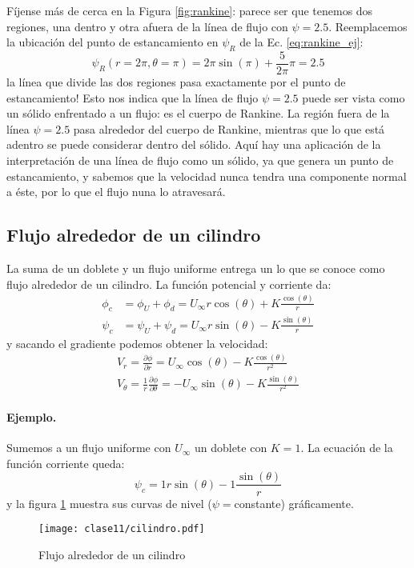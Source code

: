 Fíjense más de cerca en la Figura \ref{fig:rankine}: parece ser que tenemos dos regiones, una dentro y otra afuera de la línea de flujo con $\psi=2.5$. 
Reemplacemos la ubicación del punto de estancamiento en $\psi_R$ de la Ec. \eqref{eq:rankine_ej}:
%
\begin{equation}
\psi_R(r=2\pi,\theta=\pi) = 2\pi\sin(\pi)+\frac{5}{2\pi}\pi = 2.5
\end{equation}
%
la línea que divide las dos regiones pasa exactamente por el punto de estancamiento! 
Esto nos indica que la línea de flujo $\psi=2.5$ puede ser vista como un sólido enfrentado a un flujo: es el cuerpo de Rankine.
La región fuera de la línea $\psi=2.5$ pasa alrededor del cuerpo de Rankine, mientras que lo que está adentro se puede considerar dentro del sólido.
Aquí hay una aplicación de la interpretación de una línea de flujo como un sólido, ya que genera un punto de estancamiento, y sabemos que la velocidad nunca tendra una componente normal a éste, por lo que el flujo nuna lo atravesará.

\subsection*{Flujo alrededor de un cilindro}
La suma de un doblete y un flujo uniforme entrega un lo que se conoce como flujo alrededor de un cilindro.
La función potencial y corriente da:
%
\begin{align}\label{eq:cilindro_pot}
\phi_c &= \phi_U+\phi_d = U_\infty r\cos(\theta) + K\frac{\cos(\theta)}{r}\nonumber\\
\psi_c &= \psi_U+\psi_d = U_\infty r\sin(\theta) - K\frac{\sin(\theta)}{r}
\end{align}
%
y sacando el gradiente podemos obtener la velocidad:
%
\begin{align}\label{eq:cilindro_vel}
V_r = \frac{\partial\phi}{\partial r} = U_\infty\cos(\theta) - K\frac{\cos(\theta)}{r^2} \nonumber\\
V_\theta = \frac{1}{r}\frac{\partial\phi}{\partial\theta} = -U_\infty\sin(\theta) - K\frac{\sin(\theta)}{r^2}
\end{align}

\paragraph{Ejemplo.} 
Sumemos a un flujo uniforme con $U_\infty$ un doblete con $K=1$.
La ecuación de la función corriente queda:
%
\begin{equation}\label{eq:cilindro_ej}
\psi_c =  1 r\sin(\theta) - 1\frac{\sin(\theta)}{r}
\end{equation}
%
y la figura \ref{fig:cilindro} muestra sus curvas de nivel ($\psi=$constante) gráficamente.
%
\begin{figure}[h!]
\centering
\texttt{[image: clase11/cilindro.pdf]}
\caption{Flujo alrededor de un cilindro}
\label{fig:cilindro}
\end{figure}

